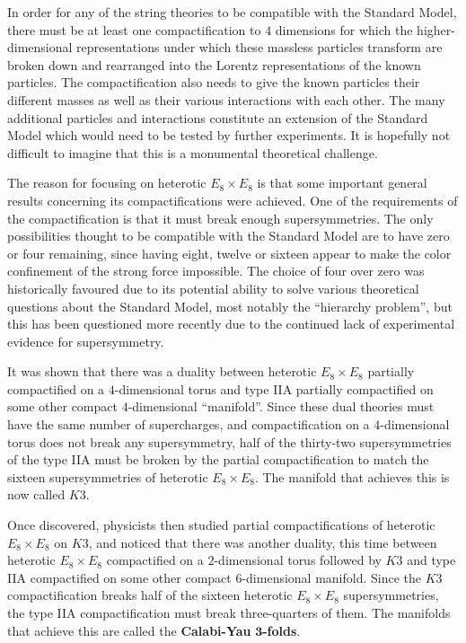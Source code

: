 \documentclass[12pt]{article}
\begin{document}
In order for any of the string theories to be compatible with the Standard Model, there must be at least one compactification to $4$ dimensions for which the higher-dimensional representations under which these massless particles transform are broken down and rearranged into the Lorentz representations of the known particles. The compactification also needs to give the known particles their different masses as well as their various interactions with each other. The many additional particles and interactions constitute an extension of the Standard Model which would need to be tested by further experiments. It is hopefully not difficult to imagine that this is a monumental theoretical challenge.
\newline

The reason for focusing on heterotic $E_8 \times E_8$ is that some important general results concerning its compactifications were achieved. One of the requirements of the compactification is that it must break enough supersymmetries. The only possibilities thought to be compatible with the Standard Model are to have zero or four remaining, since having eight, twelve or sixteen appear to make the color confinement of the strong force impossible. The choice of four over zero was historically favoured due to its potential ability to solve various theoretical questions about the Standard Model, most notably the ``hierarchy problem'', but this has been questioned more recently due to the continued lack of experimental evidence for supersymmetry.
\newline

It was shown that there was a duality between heterotic $E_8 \times E_8$ partially compactified on a $4$-dimensional torus and type IIA partially compactified on some other compact $4$-dimensional ``manifold''. Since these dual theories must have the same number of supercharges, and compactification on a $4$-dimensional torus does not break any supersymmetry, half of the thirty-two supersymmetries of the type IIA must be broken by the partial compactification to match the sixteen supersymmetries of heterotic $E_8 \times E_8$. The manifold that achieves this is now called $K3$.
\newline

Once discovered, physicists then studied partial compactifications of heterotic $E_8 \times E_8$ on $K3$, and noticed that there was another duality, this time between heterotic $E_8 \times E_8$ compactified on a $2$-dimensional torus followed by $K3$ and type IIA compactified on some other compact $6$-dimensional manifold. Since the $K3$ compactification breaks half of the sixteen heterotic $E_8 \times E_8$ supersymmetries, the type IIA compactification must break three-quarters of them. The manifolds that achieve this are called the \textbf{Calabi-Yau} $\mathbf{3}$\textbf{-folds}.
\newline
\end{document}
